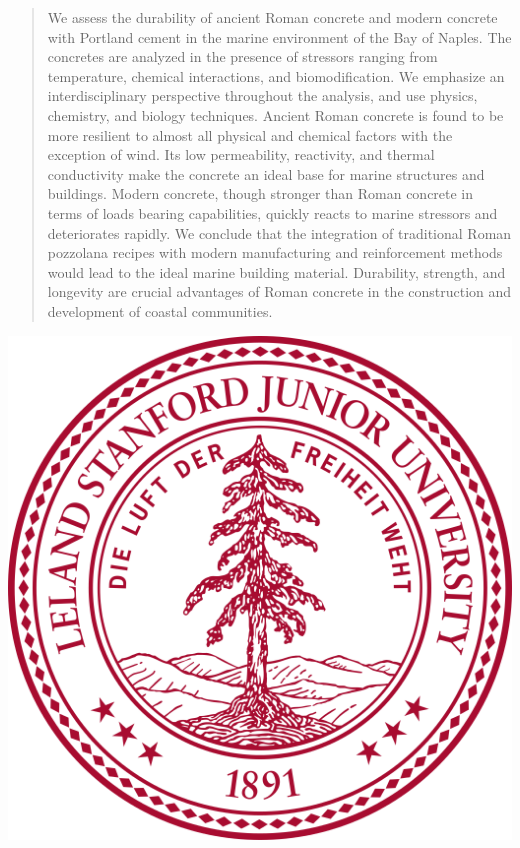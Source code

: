 \documentclass[12pt]{article}
\begin{document}
\begin{titlepage}
\begin{abstract}
We assess the durability of ancient Roman concrete and modern concrete with Portland cement in the marine environment of the Bay of Naples. The concretes are analyzed in the presence of stressors ranging from temperature, chemical interactions, and biomodification. We emphasize an interdisciplinary perspective throughout the analysis, and use physics, chemistry, and biology techniques. Ancient Roman concrete is found to be more resilient to almost all physical and chemical factors with the exception of wind. Its low permeability, reactivity, and thermal conductivity make the concrete an ideal base for marine structures and buildings. Modern concrete, though stronger than Roman concrete in terms of loads bearing capabilities, quickly reacts to marine stressors and deteriorates rapidly. We conclude that the integration of traditional Roman pozzolana recipes with modern manufacturing and reinforcement methods would lead to the ideal marine building material. Durability, strength, and longevity are crucial advantages of Roman concrete in the construction and development of coastal communities. 

\end{abstract}

\includegraphics[scale = .15]{Stanford_University_seal_2003_svg.png}\\[1cm] %
\vfill %

\end{titlepage}
\end{document}
